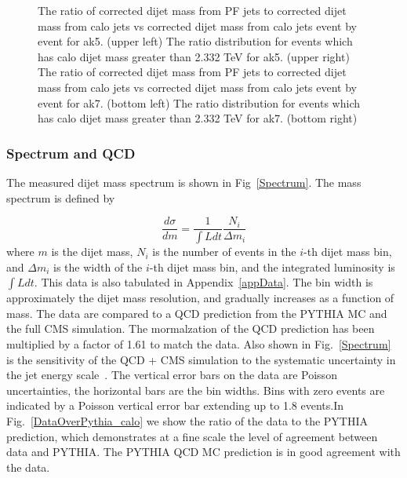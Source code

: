 \begin{figure}[!ht]
\begin{center}
    \caption{ The ratio of corrected dijet mass from PF jets to corrected dijet mass
      from calo jets vs corrected dijet mass from calo jets event by event for ak5. (upper left)
      The ratio distribution for events which has calo dijet mass greater than 2.332 TeV for ak5.
      (upper right)  The ratio of corrected dijet mass from PF jets to corrected dijet mass
      from calo jets vs corrected dijet mass from calo jets event by event for ak7. (bottom left)
      The ratio distribution for events which has calo dijet mass greater than 2.332 TeV for ak7.
      (bottom right) }
    \label{DijetMass_compare_PF_Calo}
  \end{center}
\end{figure}

\subsubsection{Spectrum and QCD}
The measured dijet mass spectrum is shown in Fig~\ref{Spectrum}. The mass spectrum
is defined by 

\begin{equation}
\frac{d\sigma}{dm} = \frac{1}{\int Ldt} \frac{N_{i}}{\Delta m_i}
\label{eqXsec}
\end{equation}
where $m$ is the dijet mass, $N_i$ is the number of events in the
$i$-th dijet mass bin, and $\Delta m_i$ is the width of the $i$-th
dijet mass bin, and the integrated luminosity is $\int Ldt$.  This
data is also tabulated in Appendix~\ref{appData}.  The bin width is
approximately the dijet mass resolution, and gradually increases as a
function of mass.  The data are compared to a QCD prediction from the
PYTHIA MC and the full CMS simulation.  The 
mormalzation of the QCD prediction has been multiplied by a factor of
1.61 to match the data.  Also shown in Fig.~\ref{Spectrum} is the
sensitivity of the QCD + CMS simulation to the systematic uncertainty
in the jet energy scale~\cite{PAS_JME_10-010}. The vertical error bars
on the data are Poisson uncertainties, the horizontal bars are the bin
widths. Bins with zero events are indicated by a Poisson vertical error
bar extending up to 1.8 events.In Fig.~\ref{DataOverPythia_calo} we show the
ratio of the data to the PYTHIA prediction, which demonstrates at a fine
scale the level of agreement between data and PYTHIA. The PYTHIA QCD MC
prediction is in good agreement with the data. 




